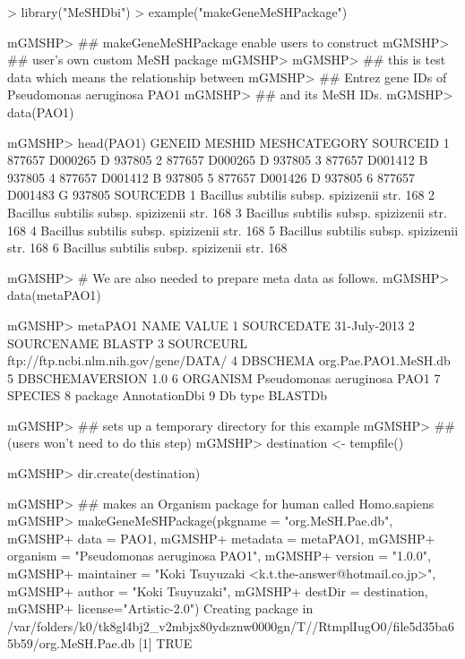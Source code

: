 \documentclass[11pt]{article}
\begin{document}
\begin{center}
\begin{Schunk}
\begin{Sinput}
> library("MeSHDbi")
> example("makeGeneMeSHPackage")
\end{Sinput}
\begin{Soutput}
mGMSHP> ## makeGeneMeSHPackage enable users to construct
mGMSHP> ## user's own custom MeSH package
mGMSHP> 
mGMSHP> ## this is test data which means the relationship between
mGMSHP> ## Entrez gene IDs of Pseudomonas aeruginosa PAO1
mGMSHP> ## and its MeSH IDs.
mGMSHP> data(PAO1)

mGMSHP> head(PAO1)
  GENEID  MESHID MESHCATEGORY SOURCEID
1 877657 D000265            D   937805
2 877657 D000265            D   937805
3 877657 D001412            B   937805
4 877657 D001412            B   937805
5 877657 D001426            D   937805
6 877657 D001483            G   937805
                                      SOURCEDB
1 Bacillus subtilis subsp. spizizenii str. 168
2 Bacillus subtilis subsp. spizizenii str. 168
3 Bacillus subtilis subsp. spizizenii str. 168
4 Bacillus subtilis subsp. spizizenii str. 168
5 Bacillus subtilis subsp. spizizenii str. 168
6 Bacillus subtilis subsp. spizizenii str. 168

mGMSHP> # We are also needed to prepare meta data as follows.
mGMSHP> data(metaPAO1)

mGMSHP> metaPAO1
             NAME                                 VALUE
1      SOURCEDATE                          31-July-2013
2      SOURCENAME                                BLASTP
3       SOURCEURL ftp://ftp.ncbi.nlm.nih.gov/gene/DATA/
4        DBSCHEMA                  org.Pae.PAO1.MeSH.db
5 DBSCHEMAVERSION                                   1.0
6        ORGANISM           Pseudomonas aeruginosa PAO1
7         SPECIES                                      
8         package                         AnnotationDbi
9         Db type                               BLASTDb

mGMSHP> ## sets up a temporary directory for this example
mGMSHP> ## (users won't need to do this step)
mGMSHP> destination <- tempfile()

mGMSHP> dir.create(destination)

mGMSHP> ## makes an Organism package for human called Homo.sapiens
mGMSHP> makeGeneMeSHPackage(pkgname = "org.MeSH.Pae.db",
mGMSHP+ 					data = PAO1,
mGMSHP+           metadata = metaPAO1,
mGMSHP+ 					organism = "Pseudomonas aeruginosa PAO1",
mGMSHP+ 					version = "1.0.0",
mGMSHP+ 					maintainer = "Koki Tsuyuzaki <k.t.the-answer@hotmail.co.jp>",
mGMSHP+ 					author = "Koki Tsuyuzaki",
mGMSHP+ 					destDir = destination,
mGMSHP+ 					license="Artistic-2.0")
Creating package in /var/folders/k0/tk8gl4bj2_v2mbjx80ydsznw0000gn/T//RtmplIugO0/file5d35ba65b59/org.MeSH.Pae.db 
[1] TRUE
\end{Soutput}
\end{Schunk}
\end{center}
\end{document}
